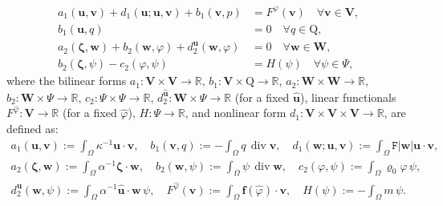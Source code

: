 \documentclass[11pt, reqno, a4paper, twoside]{article}
\newcommand{\bu}{\boldsymbol{u}}
\newcommand{\bv}{\boldsymbol{v}}
\newcommand{\bw}{\boldsymbol{w}}
\renewcommand{\bf}{\boldsymbol{f}}
\newcommand\bzeta{\boldsymbol{\zeta}}
\newcommand{\rF}{\mathtt{F}}
\newcommand{\rQ}{\mathrm{Q}}
\newcommand{\bW}{\mathbf{W}}
\newcommand{\bV}{\mathbf{V}}
\newcommand\vdiv{\mathop{\mathrm{div}}\nolimits}
\numberwithin{equation}{section}
\numberwithin{remark}{section}
\numberwithin{figure}{section}
\numberwithin{table}{section}
\begin{document}
{\begin{subequations}\label{eq:weak}
    \begin{align}
    a_1(\bu,\bv) + d_1(\bu; \bu,\bv) +  b_1(\bv,p) & = F^{\varphi}(\bv) \quad \forall \bv \in \bV,\label{eq:weak,1}\\
    b_1(\bu,q) & = 0 \quad \forall q \in \rQ,\label{eq:weak,2}\\
    a_2(\bzeta,\bw) + b_2(\bw,\varphi) + d_2^{\bu}(\bw, \varphi) & = 0 \quad \forall \bw \in \bW, \label{eq:weak,3}\\
    b_2(\bzeta, \psi) - c_2(\varphi,\psi) & = H(\psi) \quad \forall \psi \in \Psi, \label{eq:weak,4}
    \end{align}
\end{subequations}
where the  bilinear forms $a_1:\bV\times\bV\to\mathbb{R}$, $b_1:\bV\times\rQ \to \mathbb{R}$,  $a_2:\bW\times\bW\to\mathbb{R}$, $b_2:\bW\times\Psi \to \mathbb{R}$, $c_2: \Psi \times \Psi \to \mathbb{R}$,  $d_2^{\hat{\bu}}: \bW \times \Psi \to \mathbb{R}$ (for a fixed $\hat{\bu}$),  
linear functionals $F^{\hat{\varphi}}:\bV\to\mathbb{R}$ (for a fixed $\hat{\varphi}$), $H:\Psi \to \mathbb{R}$, and nonlinear form $d_1:\bV\times\bV\times\bV \to \mathbb{R}$, are defined as: 
\begin{gather*}
  a_1(\bu,\bv):= \int_\Omega \kappa^{-1}\bu\cdot\bv, \quad {b_1(\bv,q):= -\int_\Omega q\,\vdiv\bv},  \quad d_1(\bw;\bu,\bv):=\int_\Omega \rF |\bw|\bu\cdot\bv, \\ 
  a_2(\bzeta,\bw):= \int_\Omega \alpha^{-1}\bzeta\cdot\bw, \quad  b_2(\bw,\psi):= \int_\Omega \psi\,\vdiv\bw, \quad   c_2(\varphi,\psi):=\int_\Omega { \varrho_0} \varphi\,\psi, \\  
  d_2^{\hat{\bu}}(\bw,\psi):={\int_\Omega  \alpha^{-1}\hat{\bu}\cdot \bw \,\psi},\quad 
  F^{\hat{\varphi}}(\bv):= \int_\Omega \bf(\hat{\varphi})\cdot\bv, \quad H(\psi) := - \int_\Omega m\,\psi.   
\end{gather*}
 

}
\end{document}
